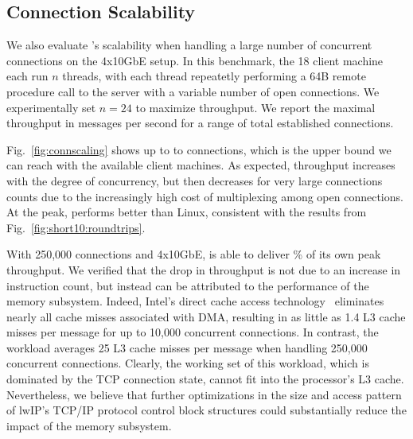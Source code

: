 \subsection{Connection Scalability}

\label{sec:eval:scale}

We also evaluate \ix's scalability when handling a large number of
concurrent connections on the 4x10GbE setup. In this benchmark, the 18 client machine each run
$n$ threads, with each thread repeatetly performing a 64B remote
procedure call to the server with a variable number of open connections. 
We experimentally set $n=24$ to maximize throughput.  We report
the maximal throughput in messages per second for a range of
total established connections.



Fig.~\ref{fig:connscaling} shows up to to  connections, which
is the upper bound we can reach with the available client machines.
As expected, throughput increases with the degree of concurrency, but
then decreases for very large connections counts due to the
increasingly high cost of multiplexing among open connections.  At the
peak, \ix performs  better than Linux, consistent with the results
from Fig.~\ref{fig:short10:roundtrips}.  

With 250,000 connections and
4x10GbE, \ix is able to deliver  \% of its own peak throughput.
We verified that the drop in throughput is not due to an increase in
instruction count, but instead can be attributed to the performance of
the memory subsystem. Indeed, Intel's direct cache access
technology~\cite{DBLP:conf/isca/HuggahalliIT05}  eliminates nearly all
cache misses associated with DMA, resulting in as little as 1.4 L3
cache misses per message for up to 10,000 concurrent connections.  In
contrast, the workload averages 25 L3 cache misses per message when
handling 250,000 concurrent connections.  Clearly, the working set of
this workload, which is dominated by the TCP connection state, cannot
fit into the processor's L3 cache.  Nevertheless, we believe that
further optimizations in the size and access pattern of lwIP's TCP/IP
protocol control block structures could substantially reduce the
impact of the memory subsystem.
  



